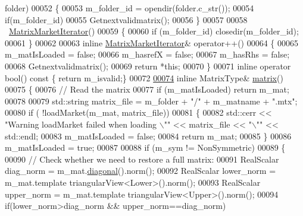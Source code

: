 \begin{DoxyCode}
      folder)
00052     \{
00053       m\_folder\_id = opendir(folder.c\_str());
00054       \textcolor{keywordflow}{if}(m\_folder\_id)
00055         Getnextvalidmatrix();
00056     \}
00057     
00058     ~\hyperlink{class_eigen_1_1_matrix_market_iterator}{MatrixMarketIterator}()
00059     \{
00060       \textcolor{keywordflow}{if} (m\_folder\_id) closedir(m\_folder\_id); 
00061     \}
00062     
00063     \textcolor{keyword}{inline} \hyperlink{class_eigen_1_1_matrix_market_iterator}{MatrixMarketIterator}& operator++()
00064     \{
00065       m\_matIsLoaded = \textcolor{keyword}{false};
00066       m\_hasrefX = \textcolor{keyword}{false};
00067       m\_hasRhs = \textcolor{keyword}{false};
00068       Getnextvalidmatrix();
00069       \textcolor{keywordflow}{return} *\textcolor{keyword}{this};
00070     \}
00071     \textcolor{keyword}{inline} \textcolor{keyword}{operator} bool()\textcolor{keyword}{ const }\{ \textcolor{keywordflow}{return} m\_isvalid;\}
00072     
\hyperlink{class_eigen_1_1_matrix_market_iterator_ac938961d685306ef5b48d9943f7dcabd}{00074}     \textcolor{keyword}{inline} MatrixType& \hyperlink{class_eigen_1_1_matrix_market_iterator_ac938961d685306ef5b48d9943f7dcabd}{matrix}() 
00075     \{ 
00076       \textcolor{comment}{// Read the matrix}
00077       \textcolor{keywordflow}{if} (m\_matIsLoaded) \textcolor{keywordflow}{return} m\_mat;
00078       
00079       std::string matrix\_file = m\_folder + \textcolor{stringliteral}{"/"} + m\_matname + \textcolor{stringliteral}{".mtx"};
00080       \textcolor{keywordflow}{if} ( !loadMarket(m\_mat, matrix\_file)) 
00081       \{
00082         std::cerr << \textcolor{stringliteral}{"Warning loadMarket failed when loading \(\backslash\)""} << matrix\_file << \textcolor{stringliteral}{"\(\backslash\)""} << std::endl;
00083         m\_matIsLoaded = \textcolor{keyword}{false};
00084         \textcolor{keywordflow}{return} m\_mat;
00085       \}
00086       m\_matIsLoaded = \textcolor{keyword}{true}; 
00087 
00088       \textcolor{keywordflow}{if} (m\_sym != NonSymmetric) 
00089       \{
00090         \textcolor{comment}{// Check whether we need to restore a full matrix:}
00091         RealScalar diag\_norm  = m\_mat.\hyperlink{group___sparse_core___module_a4423486f9fd64cbac7be06c748b37e0a}{diagonal}().norm();
00092         RealScalar lower\_norm = m\_mat.template triangularView<Lower>().norm();
00093         RealScalar upper\_norm = m\_mat.template triangularView<Upper>().norm();
00094         \textcolor{keywordflow}{if}(lower\_norm>diag\_norm && upper\_norm==diag\_norm)

\end{DoxyCode}
